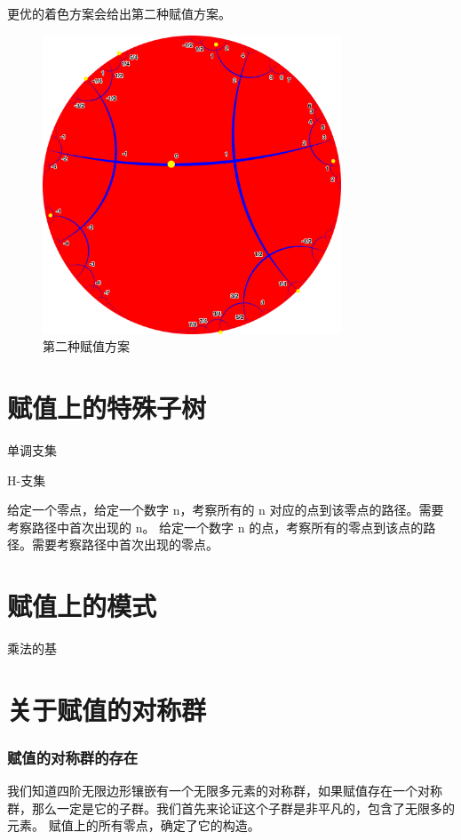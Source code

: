 \documentclass[a4paper,12pt]{article}
\begin{document}
更优的着色方案会给出第二种赋值方案。

\begin{figure}[ht]
\centering
\includegraphics[width=3.5in]{images/H2_tiling_with_assign_2.png}
\caption{第二种赋值方案}
\end{figure}

\section{赋值上的特殊子树}

单调支集

H-支集

给定一个零点，给定一个数字 n，考察所有的 n 对应的点到该零点的路径。需要考察路径中首次出现的 n。
给定一个数字 n 的点，考察所有的零点到该点的路径。需要考察路径中首次出现的零点。

\section{赋值上的模式}

乘法的基

\section{关于赋值的对称群}

\subsubsection{赋值的对称群的存在}

我们知道四阶无限边形镶嵌有一个无限多元素的对称群，如果赋值存在一个对称群，那么一定是它的子群。我们首先来论证这个子群是非平凡的，包含了无限多的元素。
赋值上的所有零点，确定了它的构造。
\end{document}
